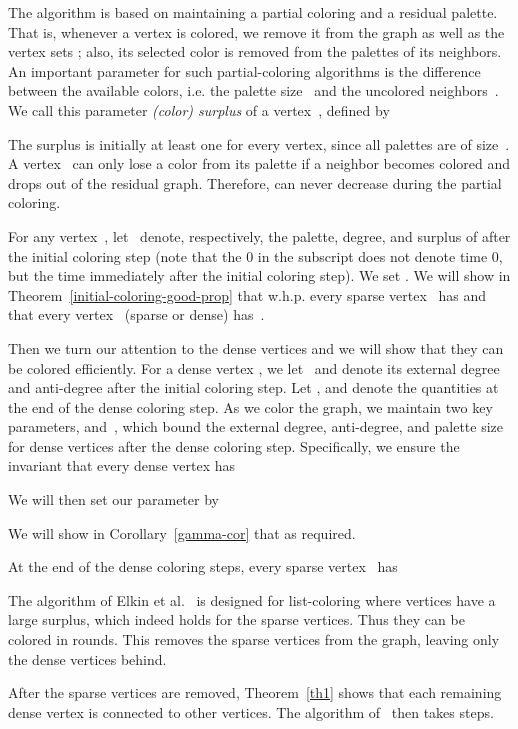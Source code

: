 \documentclass[11pt]{amsart}
\begin{document}
The algorithm is based on maintaining a partial coloring and a residual palette. That is, whenever a vertex is colored, we remove it from the graph as well as the vertex sets ; also, its selected color is removed from the palettes of its neighbors. An important parameter for such partial-coloring algorithms is the difference between the available colors, i.e. the palette size~ and the uncolored neighbors~. We call this parameter \emph{(color) surplus}  of a vertex~, defined by


The surplus  is initially at least one for every vertex, since all palettes are of size~. A vertex~ can only lose a color from its palette if a neighbor becomes colored and drops out of the residual graph. Therefore,  can never decrease during the partial coloring.

For any vertex~, let~ denote, respectively, the palette,  degree, and surplus of  after the initial coloring step (note that the 0 in the subscript does not denote time 0, but the time immediately after the initial coloring step). We set . We will show in Theorem~\ref{initial-coloring-good-prop} that w.h.p. every sparse vertex~ has  and that every vertex~ (sparse or dense) has~.

Then we turn our attention to the dense vertices and we will show that they can be colored efficiently. For a dense vertex , we let~ and  denote its external degree and anti-degree after the initial coloring step. Let , and  denote the quantities at the end of the  dense coloring step. As we color the graph, we maintain two key parameters,  and~, which bound the external degree, anti-degree, and palette size for dense vertices after the  dense coloring step. Specifically, we ensure the invariant that every dense vertex  has


We will then set our parameter  by

We will show in Corollary~\ref{gamma-cor} that  as required.
 
At the end of the dense coloring steps, every sparse vertex~ has


The algorithm of Elkin et al.~\cite{elk15} is designed for list-coloring where vertices have a large surplus, which indeed holds for the sparse vertices. Thus they can be colored in  rounds. This removes the sparse vertices from the graph, leaving only the dense vertices behind.

After the sparse vertices are removed, Theorem~\ref{th1} shows that each remaining dense vertex is connected to  other vertices. The algorithm of~\cite{BEPS16} then takes  steps.
\end{document}
